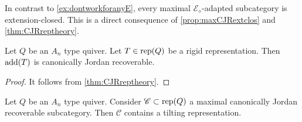 \begin{remark}
    In contrast to \cref{ex:dontworkforanyE}, every maximal $\mathcal{E}_\diamond$-adapted subcategory is extension-closed. This is a direct consequence of \cref{prop:maxCJRextclos} and \cref{thm:CJRreptheory}.
\end{remark}

 \begin{prop} \label{prop:addTCJR}
    Let $Q$ be an $A_n$ type quiver. Let $T \in \operatorname{rep}(Q)$ be a rigid representation. Then $\operatorname{add}(T)$ is canonically Jordan recoverable.
\end{prop}

\begin{proof}
   It follows from \cref{thm:CJRreptheory}.
\end{proof}

\begin{prop} \label{prop:existtiltmaxCJR}
    Let $Q$ be an $A_n$ type quiver. Consider $\mathscr{C} \subset \operatorname{rep}(Q)$ a maximal canonically Jordan recoverable subcategory. Then $\mathscr{C}$ contains a tilting representation.
\end{prop}


